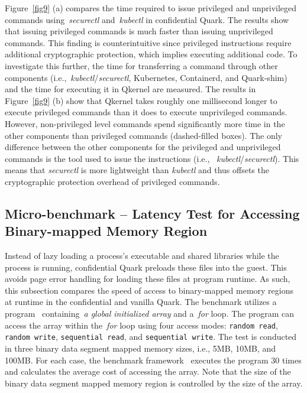 Figure~\ref{fig9} (a) compares the time required to issue privileged and unprivileged commands using~\emph{securectl} and~\emph{kubectl} in confidential Quark. The results show that issuing privileged commands is much faster than issuing unprivileged commands. 
This finding is counterintuitive since privileged instructions require additional cryptographic protection, which implies executing additional code. To investigate this further, the time for transferring a command through other components (i.e.,~\emph{kubectl}/\emph{securectl},  Kubernetes, Containerd, and Quark-shim) and the time for executing it in Qkernel 
are measured.  The results in Figure~\ref{fig9} (b) show that Qkernel takes roughly one millisecond longer to execute privileged commands than it does to execute unprivileged commands. However, non-privileged level commands spend significantly more 
time in the other components than privileged commands (dashed-filled boxes). The only difference between the other components for the privileged and unprivileged commands is the tool used to issue the instructions (i.e., ~\emph{kubectl}/\emph{securectl}). This means that \emph{securectl} is more 
lightweight than \emph{kubectl} and thus offsets the cryptographic protection overhead of privileged commands.






\subsection{Micro-benchmark – Latency Test for Accessing Binary-mapped Memory Region}
\label{accesiing_binary_mapped_memory}

Instead of lazy loading a process's executable and shared libraries while the process is running, confidential Quark preloads these files into the guest. This avoids page error handling for loading these files at program runtime. As such, this subsection compares the speed of access to binary-mapped memory regions at runtime 
in the confidential and vanilla Quark. The benchmark utilizes a program~\cite*{benchamark_micro} containing~\emph{a global initialized array} and a~\emph{for} loop. The program can access the array within the~\emph{for} loop using four access modes: \texttt{random read}, \texttt{random write}, 
\texttt{sequential read}, and \texttt{sequential write}.  The test is conducted in three binary data segment mapped memory sizes, i.e., 5MB, 10MB, and 100MB. For each case, the benchmark framework~\cite*{benchamark_framework} executes the program 30 times and calculates the average cost of accessing the array. Note that the size of the binary data segment 
mapped memory region is controlled by the size of the array. 


